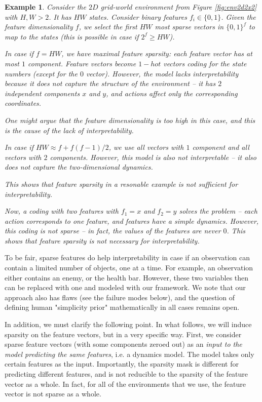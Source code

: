 \documentclass[a4paper,11pt,oneside]{report}
\newtheorem{example}{Example}[section]
\begin{document}
\begin{example}
    Consider the $2D$ grid-world environment from Figure \ref{fig:env2d2x2} with $H,W>2$. It has $HW$ states. Consider binary features $f_i\in\{0,1\}$. Given the feature dimensionality $f$, we select the first $HW$ most sparse vectors in $\{0,1\}^f$ to map to the states (this is possible in case if $2^f\geq HW$).

    In case if $f=HW$, we have maximal feature sparsity: each feature vector has at most $1$ component. Feature vectors become $1-hot$ vectors coding for the state numbers (except for the $0$ vector). However, the model lacks interpretability because it does not capture the structure of the environment -- it has $2$ independent components $x$ and $y$, and actions affect only the corresponding coordinates.

    One might argue that the feature dimensionality is too high in this case, and this is the cause of the lack of interpretability.

    In case if $HW\approx f+f(f-1)/2$, we use all vectors with $1$ component and all vectors with $2$ components. However, this model is also not interpretable -- it also does not capture the two-dimensional dynamics.

    This shows that feature sparsity in a resonable example is not sufficient for interpretability.

    Now, a coding with two features with $f_1=x$ and $f_2=y$ solves the problem -- each action corresponds to one feature, and features have a simple dynamics.
    However, this coding is not sparse -- in fact, the values of the features are never $0$. This shows that feature sparsity is not necessary for interpretability.
\end{example}

To be fair, sparse features do help interpretability in case if an observation can contain a limited number of objects, one at a time. For example, an observation either contains an enemy, or the health bar. However, these two variables then can be replaced with one and modeled with our framework. We note that our approach also has flaws (see the failure modes below), and the question of defining human "simplicity prior" mathematically in all cases remains open.

In addition, we must clarify the following point. In what follows, we will induce sparsity on the feature vectors, but in a very specific way. First, we consider sparse feature vectors (with some components zeroed out) as an {\em input to the model predicting the same features}, i.e. a dynamics model. The model takes only certain features as the input. Importantly, the sparsity mask is different for predicting different features, and is not reducible to the sparsity of the feature vector as a whole. In fact, for all of the environments that we use, the feature vector is not sparse as a whole.
\end{document}
